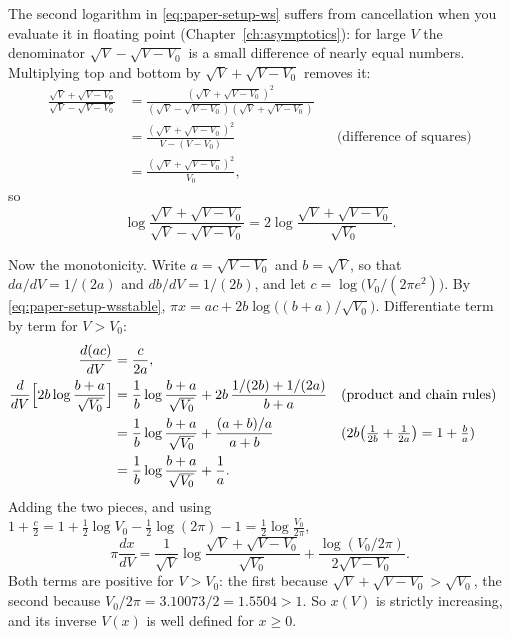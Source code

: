 The second logarithm in \eqref{eq:paper-setup-ws} suffers from cancellation when you evaluate it in floating point (Chapter~\ref{ch:asymptotics}): for large $V$ the denominator $\sqrt V-\sqrt{V-V_0}$ is a small difference of nearly equal numbers. Multiplying top and bottom by $\sqrt V+\sqrt{V-V_0}$ removes it:
\begin{align}
\frac{\sqrt V+\sqrt{V-V_0}}{\sqrt V-\sqrt{V-V_0}}
&=\frac{(\sqrt V+\sqrt{V-V_0})^2}{(\sqrt V-\sqrt{V-V_0})(\sqrt V+\sqrt{V-V_0})}\nonumber\\
&=\frac{(\sqrt V+\sqrt{V-V_0})^2}{V-(V-V_0)}
&&\text{(difference of squares)}\nonumber\\
&=\frac{(\sqrt V+\sqrt{V-V_0})^2}{V_0},\nonumber
\end{align}
so
\begin{equation}
\log\frac{\sqrt V+\sqrt{V-V_0}}{\sqrt V-\sqrt{V-V_0}}=2\log\frac{\sqrt V+\sqrt{V-V_0}}{\sqrt{V_0}} .
\label{eq:paper-setup-wsstable}
\end{equation}

Now the monotonicity. Write $a=\sqrt{V-V_0}$ and $b=\sqrt V$, so that $da/dV=1/(2a)$ and $db/dV=1/(2b)$, and let $c=\log\bigl(V_0/(2\pi e^2)\bigr)$. By \eqref{eq:paper-setup-wsstable}, $\pi x=ac+2b\log\bigl((b+a)/\sqrt{V_0}\bigr)$. Differentiate term by term for $V>V_0$:
\begin{align}
\frac{d(ac)}{dV}&=\frac{c}{2a},\nonumber\\
\frac{d}{dV}\Bigl[2b\log\frac{b+a}{\sqrt{V_0}}\Bigr]&=\frac1b\log\frac{b+a}{\sqrt{V_0}}+2b\,\frac{1/(2b)+1/(2a)}{b+a}
&&\text{(product and chain rules)}\nonumber\\
&=\frac1b\log\frac{b+a}{\sqrt{V_0}}+\frac{(a+b)/a}{a+b}
&&\text{($2b\bigl(\tfrac1{2b}+\tfrac1{2a}\bigr)=1+\tfrac ba$)}\nonumber\\
&=\frac1b\log\frac{b+a}{\sqrt{V_0}}+\frac1a .\nonumber
\end{align}
Adding the two pieces, and using $1+\tfrac c2=1+\tfrac12\log V_0-\tfrac12\log(2\pi)-1=\tfrac12\log\frac{V_0}{2\pi}$,
\begin{equation}
\pi\frac{dx}{dV}=\frac{1}{\sqrt V}\log\frac{\sqrt V+\sqrt{V-V_0}}{\sqrt{V_0}}+\frac{\log(V_0/2\pi)}{2\sqrt{V-V_0}} .
\label{eq:paper-setup-dxdv}
\end{equation}
Both terms are positive for $V>V_0$: the first because $\sqrt V+\sqrt{V-V_0}>\sqrt{V_0}$, the second because $V_0/2\pi=3.10073/2=1.5504>1$. So $x(V)$ is strictly increasing, and its inverse $V(x)$ is well defined for $x\ge0$.

